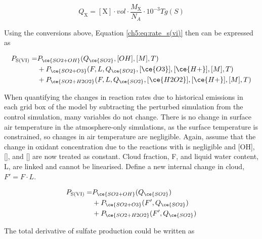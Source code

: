 \begin{equation}
    Q_\text{X}= \boxed{[\text{X}]} \cdot \boxed{vol}\cdot \frac{M_{\text{X}} }{N_A} \cdot 10^{-3} \unit{Tg(S)}
\end{equation}

Using the conversions above, Equation \ref{ch5:eq:rate_s(vi)} then can be expressed as

\begin{equation}
\begin{aligned}
    P_{\text{S(VI)}} = & P_{\ce{SO2 + OH}}(Q_{\ce{SO2}},[OH],[M],T) \\
    &+ P_{\ce{SO2 + O3}}(F,L,Q_{\ce{SO2}},[\ce{O3}], [\ce{H+}],[M],T) \\
    &+ P_{\ce{SO2 + H2O2}}(F,L,Q_{\ce{SO2}},[\ce{H2O2}], [\ce{H+}],[M],T)
\end{aligned}
\end{equation}

When quantifying the changes in reaction rates due to historical  emissions in each grid box of the model by subtracting the perturbed simulation from the control simulation, many variables do not change. There is no change in surface air temperature in the atmosphere-only simulations, as the surface temperature is constrained, so changes in air temperature are negligible. Again, assume that the change in oxidant concentration due to the reactions with  is negligible and [OH], [], and [] are now treated as constant. Cloud fraction, F, and liquid water content, L, are linked and cannot be linearised. Define a new internal change in cloud, $F' = F \cdot L$. 


\begin{equation}
\begin{aligned}
    P_{\text{S(VI)}} = & P_{\ce{SO2 + OH}}(Q_{\ce{SO2}}) \\
    &+ P_{\ce{SO2 + O3}}(F',Q_{\ce{SO2}}) \\
    &+ P_{\ce{SO2 + H2O2}}(F',Q_{\ce{SO2}})
\end{aligned}
\end{equation}

The total derivative of sulfate production could be written as

